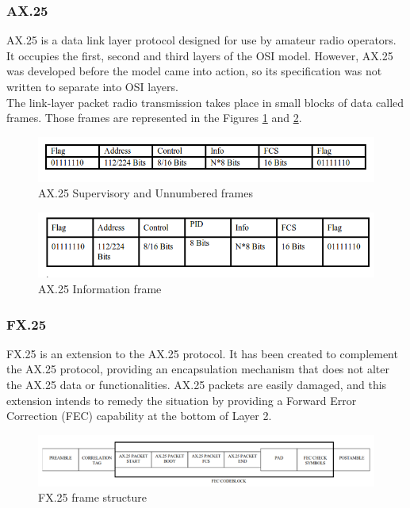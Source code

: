 \pagebreak

\subsubsection{AX.25}
AX.25 is a data link layer protocol designed for use by amateur radio operators. It occupies the first, second and third layers of the OSI model. However, AX.25 was developed before the model came into action, so its specification was not written to separate into OSI layers.\\

The link-layer packet radio transmission takes place in small blocks of data called frames. Those frames are represented in the Figures \ref{f2.8} and \ref{f2.9}.\\

 \begin{figure}[H]
\centerline{\includegraphics[width=1\textwidth]{images/ax25a.png}}
\caption{AX.25 Supervisory and Unnumbered frames \cite{AX25}}
\label{f2.8}
\end{figure}

\begin{figure}[H]
\centerline{\includegraphics[width=1\textwidth]{images/ax25b.png}}
\caption{AX.25 Information frame \cite{AX25}}
\label{f2.9}
\end{figure}

\subsubsection{FX.25}
FX.25 is an extension to the AX.25 protocol. It has been created to complement the AX.25 protocol, providing an encapsulation mechanism that does not alter the AX.25 data or functionalities. AX.25 packets are easily damaged, and this extension intends to remedy the situation by providing a Forward Error Correction (FEC) capability at the bottom of Layer 2.

\begin{figure}[H]
\centerline{\includegraphics[width=1\textwidth]{images/fx25.png}}
\caption{FX.25 frame structure \cite{FX25}}
\label{f2.10}
\end{figure}

\newpage

\newpage
